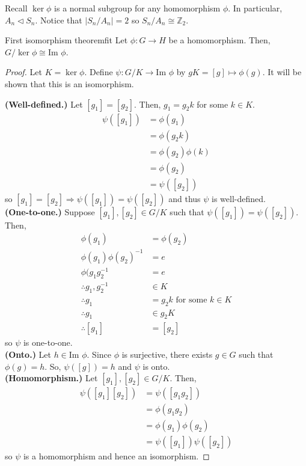 \documentclass[12pt]{article}
\newcommand{\Z}{\mathbb{Z}}
\newcommand{\inv}{^{-1}}
\renewcommand{\Im}{\text{Im }}
\begin{document}
	\begin{myex}{}{}
		Recall $\ker\phi$ is a normal subgroup for any homomorphism $\phi$. In particular, $A_n\lhd S_n$. Notice that $|S_n/A_n|=2$ so $S_n/A_n\cong\Z_2$.
	\end{myex}
	
	\begin{mythm}{First isomorphism theorem}{fit}
		Let $\phi:G\to H$ be a homomorphism. Then, $G/\ker\phi\cong\Im\phi$.
		\begin{proof}
			Let $K=\ker\phi$. Define $\psi:G/K\to\Im\phi$ by $gK=[g]\mapsto\phi(g)$. It will be shown that this is an isomorphism.
			
			\textbf{(Well-defined.)} Let $[g_1]=[g_2]$. Then, $g_1=g_2k$ for some $k\in K$.
			\begin{align*}
				\psi([g_1])&=\phi(g_1)\\
				&=\phi(g_2k)\\
				&=\phi(g_2)\phi(k)\\
				&=\phi(g_2)\\
				&=\psi([g_2])
			\end{align*}
			so $[g_1]=[g_2]\Longrightarrow\psi([g_1])=\psi([g_2])$ and thus $\psi$ is well-defined.\\
			
			\textbf{(One-to-one.)} Suppose $[g_1], [g_2]\in G/K$ such that $\psi([g_1])=\psi([g_2])$. Then,
			\begin{align*}
				\phi(g_1)&=\phi(g_2)\\
				\phi(g_1)\phi(g_2)\inv&=e\\
				\phi(g_1g_2\inv&=e\\
				\therefore g_1, g_2\inv&\in K\\
				\therefore g_1&=g_2k\text{ for some }k\in K\\
				\therefore g_1&\in g_2K\\
				\therefore [g_1]&=[g_2]
			\end{align*}
			so $\psi$ is one-to-one.\\
			
			\textbf{(Onto.)} Let $h\in\Im\phi$. Since $\phi$ is surjective, there exists $g\in G$ such that $\phi(g)=h$. So, $\psi([g])=h$ and $\psi$ is onto.\\
			
			\textbf{(Homomorphism.)} Let $[g_1], [g_2]\in G/K$. Then,
			\begin{align*}
				\psi([g_1][g_2])&=\psi([g_1g_2])\\
				&=\phi(g_1g_2)\\
				&=\phi(g_1)\phi(g_2)\\
				&=\psi([g_1])\psi([g_2])
			\end{align*}
			so $\psi$ is a homomorphism and hence an isomorphism.
		\end{proof}
	\end{mythm}
	
\end{document}
